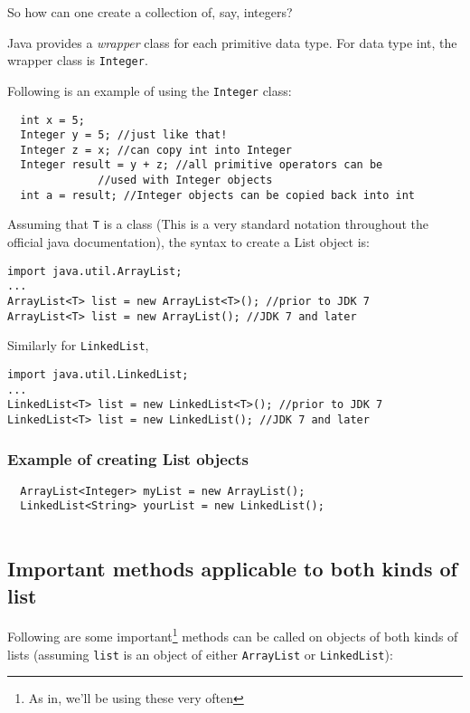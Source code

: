 So how can one create a collection of, say, integers?

Java provides a \emph{wrapper} class for each primitive data type. For data type int, the wrapper class is \texttt{Integer}.

Following is an example of using the \texttt{Integer} class:

\begin{lstlisting}
  int x = 5;
  Integer y = 5; //just like that!
  Integer z = x; //can copy int into Integer
  Integer result = y + z; //all primitive operators can be
   			  //used with Integer objects
  int a = result; //Integer objects can be copied back into int
\end{lstlisting}

Assuming that \texttt{T} is a class (This is a very standard notation throughout the official java documentation), the syntax to create a List object is:

\begin{lstlisting}
import java.util.ArrayList; 
...
ArrayList<T> list = new ArrayList<T>(); //prior to JDK 7
ArrayList<T> list = new ArrayList(); //JDK 7 and later
\end{lstlisting}

Similarly for \texttt{LinkedList},

\begin{lstlisting}
import java.util.LinkedList; 
...
LinkedList<T> list = new LinkedList<T>(); //prior to JDK 7
LinkedList<T> list = new LinkedList(); //JDK 7 and later
\end{lstlisting}

\subsubsection{Example of creating List objects}

\begin{lstlisting}
  ArrayList<Integer> myList = new ArrayList();
  LinkedList<String> yourList = new LinkedList();
  
\end{lstlisting}

\subsection{Important methods applicable to both kinds of list}

Following are some important\footnote{As in, we'll be using these very often} methods can be called on objects of both kinds of lists (assuming \texttt{list} is an object of either \texttt{ArrayList} or \texttt{LinkedList}):

